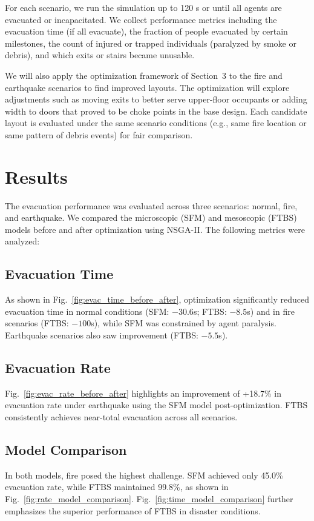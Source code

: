 \documentclass[11pt,a4paper]{article}
\begin{document}
For each scenario, we run the simulation up to 120 s or until all agents are evacuated or incapacitated. We collect performance metrics including the evacuation time (if all evacuate), the fraction of people evacuated by certain milestones, the count of injured or trapped individuals (paralyzed by smoke or debris), and which exits or stairs became unusable.

We will also apply the optimization framework of Section~3 to the fire and earthquake scenarios to find improved layouts. The optimization will explore adjustments such as moving exits to better serve upper-floor occupants or adding width to doors that proved to be choke points in the base design. Each candidate layout is evaluated under the same scenario conditions (e.g., same fire location or same pattern of debris events) for fair comparison.

\section{Results}

The evacuation performance was evaluated across three scenarios: normal, fire, and earthquake. We compared the microscopic (SFM) and mesoscopic (FTBS) models before and after optimization using NSGA-II. The following metrics were analyzed:

\subsection{Evacuation Time}
As shown in Fig.~\ref{fig:evac_time_before_after}, optimization significantly reduced evacuation time in normal conditions (SFM: $-30.6$s; FTBS: $-8.5$s) and in fire scenarios (FTBS: $-100$s), while SFM was constrained by agent paralysis. Earthquake scenarios also saw improvement (FTBS: $-5.5$s).

\subsection{Evacuation Rate}
Fig.~\ref{fig:evac_rate_before_after} highlights an improvement of +18.7\% in evacuation rate under earthquake using the SFM model post-optimization. FTBS consistently achieves near-total evacuation across all scenarios.

\subsection{Model Comparison}
In both models, fire posed the highest challenge. SFM achieved only 45.0\% evacuation rate, while FTBS maintained 99.8\%, as shown in Fig.~\ref{fig:rate_model_comparison}. Fig.~\ref{fig:time_model_comparison} further emphasizes the superior performance of FTBS in disaster conditions.
\end{document}
